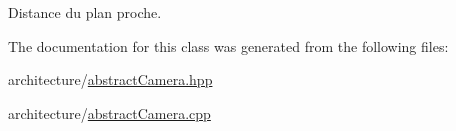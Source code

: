 Distance du plan proche. 



The documentation for this class was generated from the following files\+:\begin{DoxyCompactItemize}
\item 
architecture/\hyperlink{abstract_camera_8hpp}{abstract\+Camera.\+hpp}\item 
architecture/\hyperlink{abstract_camera_8cpp}{abstract\+Camera.\+cpp}\end{DoxyCompactItemize}
